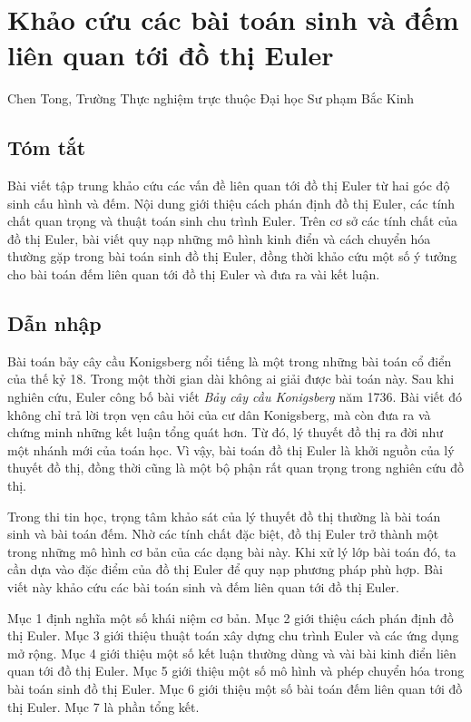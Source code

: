 \documentclass[11pt]{article}
\begin{document}
\section{Khảo cứu các bài toán sinh và đếm liên quan tới đồ thị Euler}

\begin{center}
Chen Tong, Trường Thực nghiệm trực thuộc Đại học Sư phạm Bắc Kinh
\end{center}

\subsection*{Tóm tắt}

Bài viết tập trung khảo cứu các vấn đề liên quan tới đồ thị Euler từ hai góc
độ sinh cấu hình và đếm. Nội dung giới thiệu cách phán định đồ thị Euler, các
tính chất quan trọng và thuật toán sinh chu trình Euler. Trên cơ sở các tính
chất của đồ thị Euler, bài viết quy nạp những mô hình kinh điển và cách chuyển
hóa thường gặp trong bài toán sinh đồ thị Euler, đồng thời khảo cứu một số ý
tưởng cho bài toán đếm liên quan tới đồ thị Euler và đưa ra vài kết luận.

\subsection*{Dẫn nhập}

Bài toán bảy cây cầu Konigsberg nổi tiếng là một trong những bài toán cổ điển
của thế kỷ 18. Trong một thời gian dài không ai giải được bài toán này. Sau khi
nghiên cứu, Euler công bố bài viết \emph{Bảy cây cầu Konigsberg} năm 1736. Bài
viết đó không chỉ trả lời trọn vẹn câu hỏi của cư dân Konigsberg, mà còn đưa
ra và chứng minh những kết luận tổng quát hơn. Từ đó, lý thuyết đồ thị ra đời
như một nhánh mới của toán học. Vì vậy, bài toán đồ thị Euler là khởi nguồn của
lý thuyết đồ thị, đồng thời cũng là một bộ phận rất quan trọng trong nghiên
cứu đồ thị.

Trong thi tin học, trọng tâm khảo sát của lý thuyết đồ thị thường là bài toán
sinh và bài toán đếm. Nhờ các tính chất đặc biệt, đồ thị Euler trở thành một
trong những mô hình cơ bản của các dạng bài này. Khi xử lý lớp bài toán đó, ta
cần dựa vào đặc điểm của đồ thị Euler để quy nạp phương pháp phù hợp. Bài viết
này khảo cứu các bài toán sinh và đếm liên quan tới đồ thị Euler.

Mục 1 định nghĩa một số khái niệm cơ bản. Mục 2 giới thiệu cách phán định đồ
thị Euler. Mục 3 giới thiệu thuật toán xây dựng chu trình Euler và các ứng dụng
mở rộng. Mục 4 giới thiệu một số kết luận thường dùng và vài bài kinh điển
liên quan tới đồ thị Euler. Mục 5 giới thiệu một số mô hình và phép chuyển hóa
trong bài toán sinh đồ thị Euler. Mục 6 giới thiệu một số bài toán đếm liên
quan tới đồ thị Euler. Mục 7 là phần tổng kết.
\end{document}
